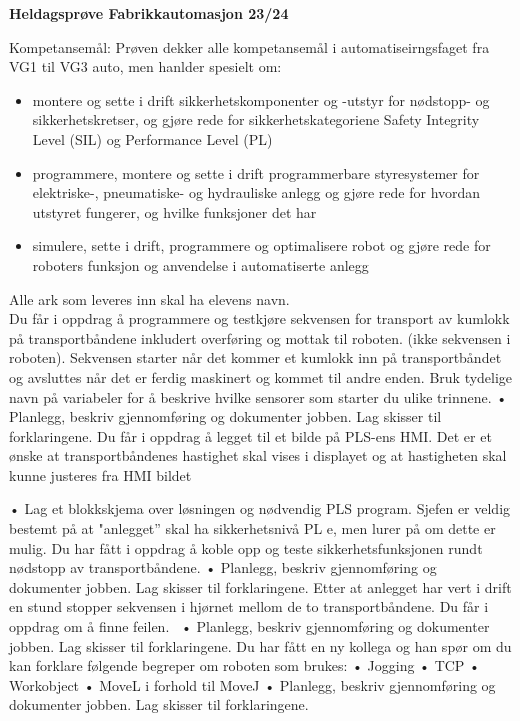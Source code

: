 
\huge
\centerline{\bf Heldagsprøve Fabrikkautomasjon 23/24}  \bigskip
\normalsize
\vskip 1cm 
Kompetansemål:
Prøven dekker alle kompetansemål i automatiseirngsfaget fra VG1 til VG3 auto, men hanlder spesielt om:
\begin{itemize}[noitemsep]

\item montere og sette i drift sikkerhetskomponenter og -utstyr for nødstopp- og sikkerhetskretser, og gjøre rede for sikkerhetskategoriene Safety Integrity Level (SIL) og Performance Level (PL)
\item programmere, montere og sette i drift programmerbare styresystemer for elektriske-, pneumatiske- og hydrauliske anlegg og gjøre rede for hvordan utstyret fungerer, og hvilke funksjoner det har
\item simulere, sette i drift, programmere og optimalisere robot og gjøre rede for roboters funksjon og anvendelse i automatiserte anlegg
\end{itemize}

Alle ark som leveres inn skal ha elevens navn. \\ 

\oppgave{}%
Du får i oppdrag å programmere og testkjøre sekvensen for transport av kumlokk på transportbåndene inkludert overføring og mottak til roboten. (ikke sekvensen i roboten). Sekvensen starter når det kommer et kumlokk inn på transportbåndet og avsluttes når det er ferdig maskinert og kommet til andre enden. Bruk tydelige navn på variabeler for å beskrive hvilke sensorer som starter du ulike trinnene. 
\vskip 1cm
• Planlegg, beskriv gjennomføring og dokumenter jobben. Lag skisser til forklaringene. 
\vskip 1cm
\oppgave{}%
 Du får i oppdrag å legget til et bilde på PLS-ens HMI. Det er et ønske at transportbåndenes hastighet skal vises i displayet og at hastigheten skal kunne justeres fra HMI bildet  

\vskip 1cm
• Lag et blokkskjema over løsningen og nødvendig PLS program.
\vskip 1cm
\oppgave{}%
Sjefen er veldig bestemt på at "anlegget” skal ha sikkerhetsnivå PL e, men lurer på om dette er mulig. Du har fått i oppdrag å koble opp og teste sikkerhetsfunksjonen rundt nødstopp av transportbåndene.
\vskip 1cm
• Planlegg, beskriv gjennomføring og dokumenter jobben. Lag skisser til forklaringene. 
\vskip 1cm
\oppgave{}%
Etter at anlegget har vert i drift en stund stopper sekvensen i hjørnet mellom de to transportbåndene. Du får i oppdrag om å finne feilen. 
\vskip 1cm
• Planlegg, beskriv gjennomføring og dokumenter jobben. Lag skisser til forklaringene. 
\vskip 1cm
\oppgave{}%
Du har fått en ny kollega og han spør om du kan forklare følgende begreper om roboten som brukes: 
\vskip 0.4cm
• Jogging 
\vskip 0.4cm
• TCP 
\vskip 0.4cm
• Workobject 
\vskip 0.4cm
• MoveL i forhold til MoveJ
\vskip 1cm
• Planlegg, beskriv gjennomføring og dokumenter jobben. Lag skisser til forklaringene. 
\vskip 1cm


